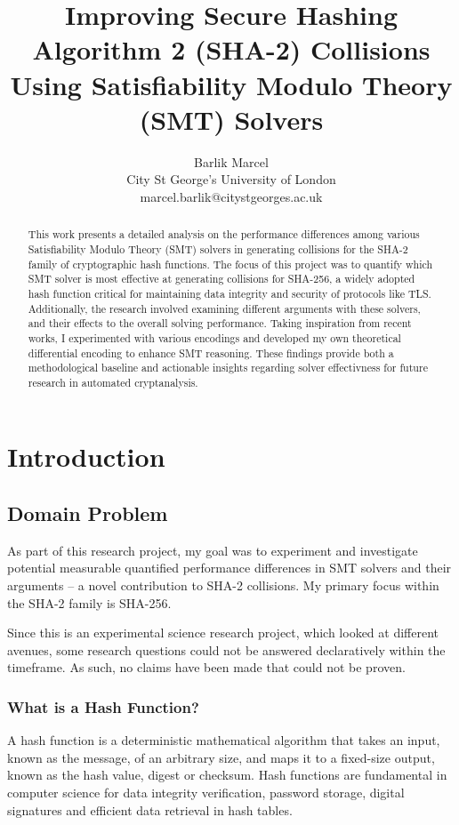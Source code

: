 \documentclass[a4paper]{report}
\begin{document}
\title{\textbf{Improving Secure Hashing Algorithm 2 (SHA-2) Collisions Using Satisfiability Modulo Theory (SMT) Solvers}}
\author{Barlik Marcel \\ City St George's University of London \\ marcel.barlik@citystgeorges.ac.uk}
\maketitle


\begin{abstract}
This work presents a detailed analysis on the performance differences among various Satisfiability Modulo Theory (SMT)
solvers in generating collisions for the SHA-2 family of cryptographic hash functions.
The focus of this project was to quantify which SMT solver is most effective at generating collisions for SHA-256,
a widely adopted hash function critical for maintaining data integrity and security of protocols like TLS.
Additionally, the research involved examining different arguments with these solvers, and their effects to the overall solving performance.
Taking inspiration from recent works, I experimented with various encodings and developed my own theoretical differential encoding to enhance SMT reasoning.
These findings provide both a methodological baseline and actionable insights regarding solver effectivness for future research in automated cryptanalysis.
\end{abstract}


\tableofcontents
\setcounter{tocdepth}{3}


\chapter{Introduction}
\section{Domain Problem}
As part of this research project, my goal was to experiment and investigate potential measurable quantified performance differences in SMT solvers and their arguments --
a novel contribution to SHA-2 collisions.
My primary focus within the SHA-2 family is SHA-256.

Since this is an experimental science research project, which looked at different avenues,
some research questions could not be answered declaratively within the timeframe.
As such, no claims have been made that could not be proven.

\subsection{What is a Hash Function?}
\label{ssec:hash-function-basics}
A hash function is a deterministic mathematical algorithm that takes an input, known as the message, of an arbitrary size,
and maps it to a fixed-size output, known as the hash value, digest or checksum.
Hash functions are fundamental in computer science for data integrity verification, password storage, digital signatures and efficient data retrieval in hash tables.
\end{document}
